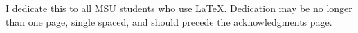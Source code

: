 
I dedicate this to all MSU students who use \LaTeX.  Dedication may be no longer than one page, single spaced, and should precede the acknowledgments page. 


